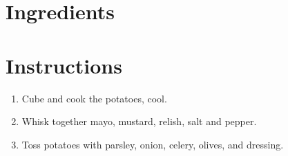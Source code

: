 \documentclass[ansiapaper,10pt,english]{sphinxmanual}
\begin{document}
\section{Ingredients}
\label{\detokenize{Potato_Sal:ingredients}}
%
\begin{sphinxVerbatim}[commandchars=\\\{\}]
   

  

   

   

  

  

  

   

   

   
\end{sphinxVerbatim}


\section{Instructions}
\label{\detokenize{Potato_Sal:instructions}}\begin{enumerate}
\item {} 
Cube and cook the potatoes, cool.

\item {} 
Whisk together mayo, mustard, relish, salt and pepper.

\item {} 
Toss potatoes with parsley, onion, celery, olives, and dressing.

\end{enumerate}
\end{document}
